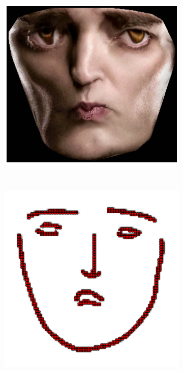\begin{figure}[h!]
\begin{subfigure}[b]{0.1\textwidth}
    \end{subfigure}
    \hfill
    \begin{subfigure}[b]{0.1\textwidth}
            \includegraphics[width=\textwidth]{resources/Fig_Draw/test_03_of}
    \end{subfigure}
    \\
    \begin{subfigure}[b]{0.1\textwidth}
            \includegraphics[width=\textwidth]{resources/Fig_Draw/test_04}

\end{subfigure}
\end{figure}
